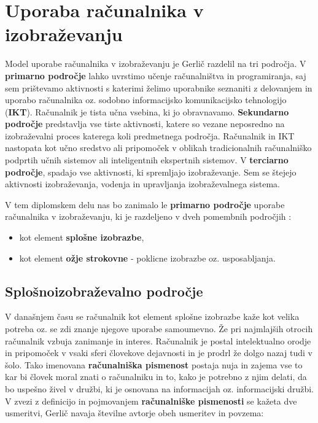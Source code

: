 \section{Uporaba računalnika v izobraževanju}
\label{sec:uporaba-raunalnika-v}

Model uporabe računalnika v izobraževanju je Gerlič \cite{gerlic_2000}
razdelil na tri področja. V \textbf{primarno področje} lahko uvrstimo
učenje računalništva in programiranja, saj sem prištevamo aktivnosti s
katerimi želimo uporabnike seznaniti z delovanjem in uporabo
računalnika oz. sodobno informacijsko komunikacijsko tehnologijo
(\textbf{IKT}). Računalnik je tista učna vsebina, ki jo
obravnavamo. \textbf{Sekundarno področje} predstavlja vse tiste
aktivnosti, katere so vezane neposredno na izobraževalni proces
katerega koli predmetnega področja. Računalnik in IKT nastopata kot
učno sredstvo ali pripomoček v oblikah tradicionalnih računalniško
podprtih učnih sistemov ali inteligentnih ekspertnih sistemov. V
\textbf{terciarno področje}, spadajo vse aktivnosti, ki spremljajo
izobraževanje. Sem se štejejo aktivnosti izobraževanja, vodenja in
upravljanja izobraževalnega sistema.

V tem diplomskem delu nas bo zanimalo le \textbf{primarno področje}
uporabe računalnika v izobraževanju, ki je razdeljeno v dveh pomembnih
področjih \cite{gerlic_2000}:

\begin{itemize}
\tightlist
\item kot element \textbf{splošne izobrazbe},
\item kot element \textbf{ožje strokovne} - poklicne izobrazbe
  oz. usposabljanja.
\end{itemize}

\subsection{Splošnoizobraževalno področje}
\label{sec:spološnoiz_področje}

V današnjem času se računalnik kot element splošne izobrazbe kaže kot
velika potreba oz. se zdi znanje njegove uporabe samoumevno. Že pri
najmlajših otrocih računalnik vzbuja zanimanje in interes.  Računalnik
je postal intelektualno orodje in pripomoček v vsaki sferi človekove
dejavnosti in je prodrl že dolgo nazaj tudi v šolo. Tako imenovana
\textbf{računalniška pismenost} postaja nuja in zajema vse to kar bi
človek moral znati o računalniku in to, kako je potrebno z njim
delati, da bo uspešno živel v družbi, ki je osnovana na informacijah
oz. informacijski družbi. V zvezi z definicijo in pojmovanjem
\textbf{računalniške pismenosti} se kažeta dve usmeritvi, Gerlič
\cite{gerlic_2000} navaja številne avtorje obeh usmeritev in povzema:

